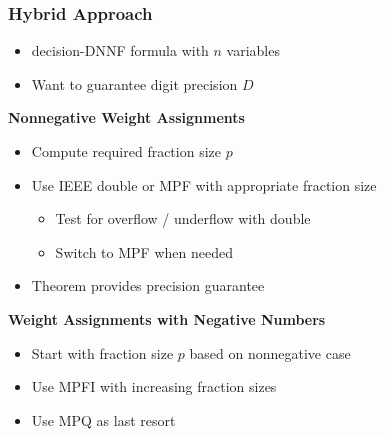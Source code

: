 \documentclass[t,pdf]{beamer}
\newcommand{\bitem}{\item[$\bullet$]}
\begin{document}
\begin{frame}

\frametitle{Hybrid Approach}

\smallskip

\begin{itemize}
\item decision-DNNF formula with $n$ variables
\item Want to guarantee digit precision $D$
\end{itemize}

\medskip

\textbf{Nonnegative Weight Assignments}

\smallskip

\begin{itemize}
\item Compute required fraction size $p$
\item Use IEEE double or MPF with appropriate fraction size
  \begin{itemize}
    \bitem Test for overflow / underflow with double
    \bitem Switch to MPF when needed
  \end{itemize}
\item Theorem provides precision guarantee
\end{itemize}

\medskip

\textbf{Weight Assignments with Negative Numbers}

\smallskip

\begin{itemize}
\item Start with fraction size $p$ based on nonnegative case
\item Use MPFI with increasing fraction sizes
\item Use MPQ as last resort
\end{itemize}

\end{frame}
\end{document}
